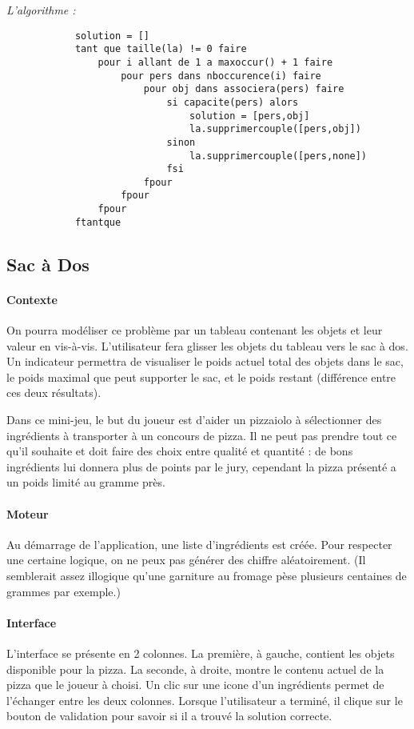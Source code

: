 			\emph{L'algorithme :}

			\begin{lstlisting}
			solution = []
			tant que taille(la) != 0 faire
				pour i allant de 1 a maxoccur() + 1 faire
					pour pers dans nboccurence(i) faire
						pour obj dans associera(pers) faire
							si capacite(pers) alors
								solution = [pers,obj]
								la.supprimercouple([pers,obj])
							sinon
								la.supprimercouple([pers,none])
							fsi
						fpour
					fpour
				fpour
			ftantque
			\end{lstlisting}





    \subsection{Sac à Dos}
        \paragraph{Contexte}
        On pourra modéliser ce problème par un tableau contenant les objets et leur
        valeur en vis-à-vis. L'utilisateur fera glisser les objets du tableau vers
        le sac à dos. Un indicateur permettra de visualiser le poids actuel total
        des objets dans le sac, le poids maximal que peut supporter le sac, et le
        poids restant (différence entre ces deux résultats).

            Dans ce mini-jeu, le but du joueur est d'aider un pizzaiolo à
            sélectionner des ingrédients à transporter à un concours de pizza.
            Il ne peut pas prendre tout ce qu'il souhaite et doit faire des
            choix entre qualité et quantité : de bons ingrédients lui donnera
            plus de points par le jury, cependant la pizza présenté a un poids
            limité au gramme près.
        \paragraph{Moteur}
            Au démarrage de l'application, une liste d'ingrédients est créée.
            Pour respecter une certaine logique, on ne peux pas générer des
            chiffre aléatoirement. (Il semblerait assez illogique qu'une
            garniture au fromage pèse plusieurs centaines de grammes par
            exemple.)
        \paragraph{Interface}
            L'interface se présente en 2 colonnes. La première, à gauche,
            contient les objets disponible pour la pizza. La seconde, à droite,
            montre le contenu actuel de la pizza que le joueur à choisi.
            Un clic sur une icone d'un ingrédients permet de l'échanger entre
            les deux colonnes.
            Lorsque l'utilisateur a terminé, il clique sur le bouton de
            validation pour savoir si il a trouvé la solution correcte.
